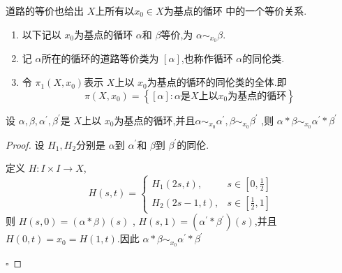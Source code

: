 \documentclass[../../几何与拓扑.tex]{subfiles}
\begin{document}
\begin{corollary}
  道路的等价也给出  \(  X  \)上所有以\(  x_0 \in X  \)为基点的循环  中的一个等价关系.
\end{corollary}


\begin{remark}
    \begin{enumerate}
        \item 以下记以 \(  x_0  \)为基点的循环 \(  \alpha   \)和 \(  \beta   \)等价,为 \(  \alpha \sim_{ x_0 }\beta   \).
        \item 记 \(  \alpha   \)所在的循环的道路等价类为 \(  [ \alpha ]  \),也称作循环 \(  \alpha   \)的同伦类.
        \item 令 \(  \pi _1 \left( X,x_0 \right)   \)表示 \(  X  \)上以 \(  x_0  \)为基点的循环的同伦类的全体.即 \[
        \pi \left( X,x_0 \right)= \left\{ [ \alpha ]:  \alpha \text{是}X \text{上以} x_0 \text{为基点的循环} \right\} 
        \]            
    \end{enumerate}
    
\end{remark}

\begin{proposition}
    设 \(   \alpha , \beta , \alpha ^{\prime} , \beta ^{\prime}   \)是 \(  X  \)上以 \(  x_0  \)为基点的循环,并且\(\alpha \sim _{x_0}  \alpha ^{\prime}  , \beta \sim _{x_0} \beta ^{\prime}   \)    
    ,则 \(  \alpha * \beta \sim _{x_0} \alpha ^{\prime} *\beta ^{\prime}   \) 
\end{proposition}

\begin{proof}

    设 \(  H_1,H_2  \)分别是  \(  \alpha   \)到 \(   \alpha ^{\prime}   \)和 \(  \beta   \)到 \(  \beta ^{\prime}   \)的同伦.
    
    定义 \(  H: I \times I \to X  \), \[
    H\left( s,t \right)=  \begin{cases} H_1\left( 2s,t \right),& s \in [0,\frac{1}{2}]\\ 
     H_2\left( 2s-1,t \right),& s \in [\frac{1}{2},1]   \end{cases}  
    \]则 \(  H\left( s,0 \right) =  \left( \alpha *\beta  \right)\left( s \right)     \)  , \(  H\left( s,1 \right)= \left(  \alpha ^{\prime} *\beta ^{\prime}  \right)\left( s \right)     \),并且 \(  H\left( 0,t \right)= x_0= H\left( 1,t \right)    \).因此 \(  \alpha *\beta \sim _{x_0}  \alpha ^{\prime} *  \beta ^{\prime}   \)   

    \hfill $\square$
\end{proof}
\end{document}
